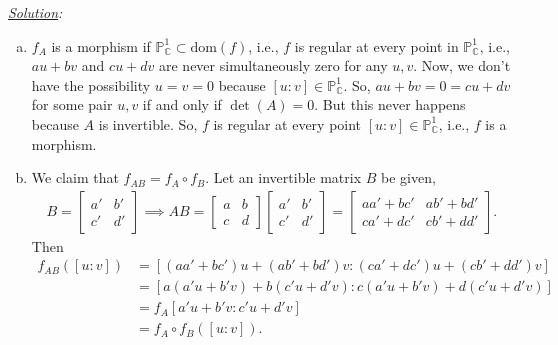 \documentclass[12pt]{article}
\begin{document}
\noindent \textit{\underline{Solution}:}

\begin{enumerate}[(a)]
	\item $f_A$ is a morphism if $\mathbb{P}^1_{\mathbb{C}} \subset \mbox{dom}(f)$, i.e., $f$ is regular at every point in $\mathbb{P}^1_{\mathbb{C}}$, i.e., $au+bv$ and $cu+dv$ are never simultaneously zero for any $u,v$. Now, we don't have the possibility $u=v=0$ because $[u:v] \in \mathbb{P}^1_{\mathbb{C}}$. So, $au+bv = 0 = cu+dv$ for some pair $u,v$ if and only if $\det(A) = 0$. But this never happens because $A$ is invertible. So, $f$ is regular at every point $[u:v] \in \mathbb{P}^1_{\mathbb{C}}$, i.e., $f$ is a morphism. 
	
	
	\item We claim that $f_{AB} = f_A \circ f_B$. Let an invertible matrix $B$ be given, 
	\begin{align*}
	B= \begin{bmatrix}
	a' & b' \\ c' & d'
	\end{bmatrix} \implies AB = \begin{bmatrix}
	a&b\\c&d
	\end{bmatrix}\begin{bmatrix}
	a'&b'\\c'&d'
	\end{bmatrix} =  \begin{bmatrix}
	aa' + bc' & ab' + bd' \\ ca' + dc' & cb' + dd'
	\end{bmatrix}.
	\end{align*}
	Then 
	\begin{align*}
	f_{AB}([u:v]) &= [(aa'+bc')u + (ab'+bd')v : (ca'+dc')u + (cb'+dd')v]\\
	&= [a(a'u + b'v) + b(c'u+d'v) :  c(a'u + b'v) + d(c'u+d'v)]\\
	&= f_A[a'u + b'v : c'u+d'v]\\
	&= f_A\circ f_B([u:v]).
	\end{align*}
	

\end{enumerate}
\end{document}
